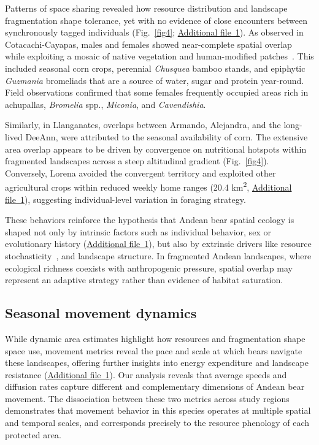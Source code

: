 \documentclass[lineno,referee,pdflatex,sn-vancouver-num]{sn-jnl}%
\theoremstyle{thmstyleone}%
\theoremstyle{thmstyletwo}%
\theoremstyle{thmstylethree}%
\begin{document}
Patterns of space sharing revealed how resource distribution and landscape fragmentation
shape tolerance, yet with no evidence of close encounters between synchronously tagged individuals (Fig.~\ref{fig4}; \hyperref[S1_File]{Additional file~1}). As observed in Cotacachi-Cayapas, males and females showed near-complete spatial overlap while exploiting a mosaic of native vegetation and human-modified patches~\cite{castellanosAndeanBearCore2013}.
This included seasonal corn crops, perennial \textit{Chusquea}
bamboo stands, and epiphytic \textit{Guzmania} bromeliads that are a source of water, sugar and protein  year-round. Field observations confirmed that some females frequently occupied areas rich in achupallas,
\textit{Bromelia} spp., \textit{Miconia}, and \textit{Cavendishia}.

Similarly, in Llanganates, overlaps between Armando, Alejandra, and the
long-lived DeeAnn, were attributed to the seasonal availability of
corn. The extensive area overlap appears to be driven by convergence on nutritional hotspots within fragmented landscapes across a steep altitudinal gradient (Fig.~\ref{fig4}). Conversely, Lorena avoided the convergent territory and exploited other agricultural crops within reduced weekly home ranges (20.4 km\textsuperscript{2}, \hyperref[S1_File]{Additional file~1}), suggesting individual-level variation in foraging strategy.

These behaviors reinforce the hypothesis that Andean bear spatial ecology is shaped not
only by intrinsic factors such as individual behavior, sex or evolutionary history (\hyperref[S1_File]{Additional file~1}), but also by extrinsic drivers like resource stochasticity~\cite{mezziniHowResourceAbundance2025}, and landscape structure. In fragmented Andean landscapes, where ecological richness coexists with anthropogenic pressure, spatial overlap may represent an adaptive strategy rather than evidence of habitat saturation.

\subsection{Seasonal movement dynamics}

While dynamic area estimates highlight how resources and fragmentation shape space use,
movement metrics reveal the pace and scale at which bears navigate these landscapes,
offering further insights into energy expenditure and landscape resistance (\hyperref[S1_File]{Additional file~1}). Our analysis reveals that average speeds and diffusion rates capture different and complementary dimensions of Andean bear movement.
The dissociation between these two metrics across study regions demonstrates that movement behavior in this species operates at multiple spatial and temporal scales, and corresponds precisely to the resource phenology of each protected area.
\end{document}
